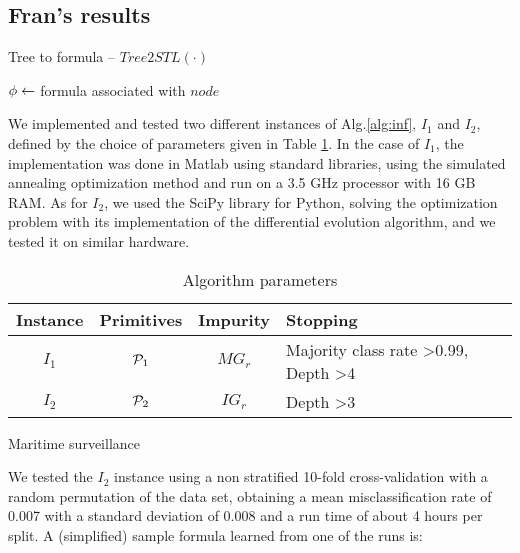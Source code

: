 \subsection{Fran's results}
\begin{algorithm}
\caption{Tree to formula -- $Tree2STL(\cdot)$}
\label{alg:tree2formula}
\DontPrintSemicolon
{}
\BlankLine


$\phi \leftarrow$ formula associated with $node$

\end{algorithm}

We implemented and tested two different instances of Alg.\ref{alg:inf}, $I_1$ and $I_2$, defined by the choice of parameters given in Table \ref{tab:inst}. In the case of $I_1$, the implementation was done in Matlab using standard libraries, using the simulated annealing optimization method and run on a 3.5 GHz processor with 16 GB RAM. As for $I_2$, we used the SciPy library for Python, solving the optimization problem with its implementation of the differential evolution algorithm, and we tested it on similar hardware.


\begin{table}
    \begin{tabular}{|c|c|c|p{3cm}|}
    \hline
    Instance & Primitives & Impurity & Stopping \\ \hline
    $I_1$ & $\mathcal{P}_1$ & $MG_r$ & Majority class rate >0.99, Depth >4 \\ \hline
    $I_2$ & $\mathcal{P}_2$ & $IG_r$ & Depth >3 \\ \hline
\end{tabular}
\caption{Algorithm parameters}
\label{tab:inst}
\end{table}

Maritime surveillance

We tested the $I_2$ instance using a non stratified 10-fold cross-validation with a random permutation of the data set, obtaining a mean misclassification rate of 0.007 with a standard deviation of 0.008 and a run time of about 4 hours per split. A (simplified) sample formula learned from one of the runs is:


